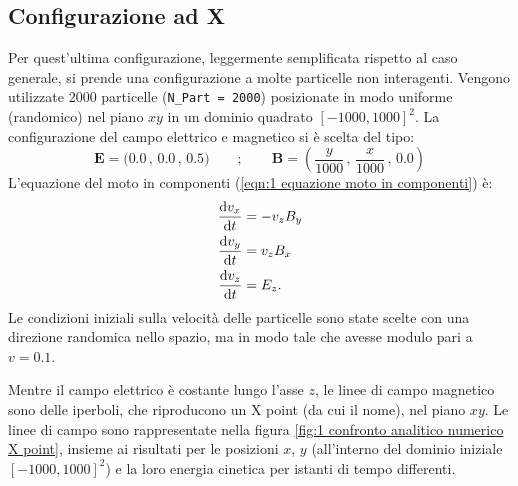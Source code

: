 \documentclass[10pt,a4paper]{article}
\begin{document}
\subsection{Configurazione ad X}

Per quest'ultima configurazione, leggermente semplificata rispetto al caso generale, si prende una configurazione a molte particelle non interagenti. Vengono utilizzate $2000$ particelle (\texttt{N\_Part = 2000}) posizionate in modo uniforme (randomico) nel piano $xy$ in un dominio quadrato $[-1000,1000]^2$. La configurazione del campo elettrico e magnetico si è scelta del tipo:
\begin{equation}
    \mathbf{E} = \big( 0.0\, , \, 0.0\, , \, 0.5 \big) \qquad ; \qquad \mathbf{B} = \left( \frac{y}{1000}\, , \, \frac{x}{1000}\, , \, 0.0 \right)
\end{equation}
L'equazione del moto in componenti (\ref{eqn:1 equazione moto in componenti}) è:
\begin{align}
    \dv{v_{x}}{t} &= -v_{z}B_{y} \notag \\
    \dv{v_{y}}{t} &= v_{z}B_{x} \label{eqn:1 edo X} \\
    \dv{v_{z}}{t} &= E_z. \notag
\end{align}
Le condizioni iniziali sulla velocità delle particelle sono state scelte con una direzione randomica nello spazio, ma in modo tale che avesse modulo pari a $v = 0.1$.

Mentre il campo elettrico è costante lungo l'asse $z$, le linee di campo magnetico sono delle iperboli, che riproducono un X point (da cui il nome), nel piano $xy$. Le linee di campo sono rappresentate nella figura \ref{fig:1 confronto analitico numerico X point}, insieme ai risultati per le posizioni $x$, $y$ (all'interno del dominio iniziale $[-1000,1000]^2$) e la loro energia cinetica per istanti di tempo differenti. 
\end{document}
